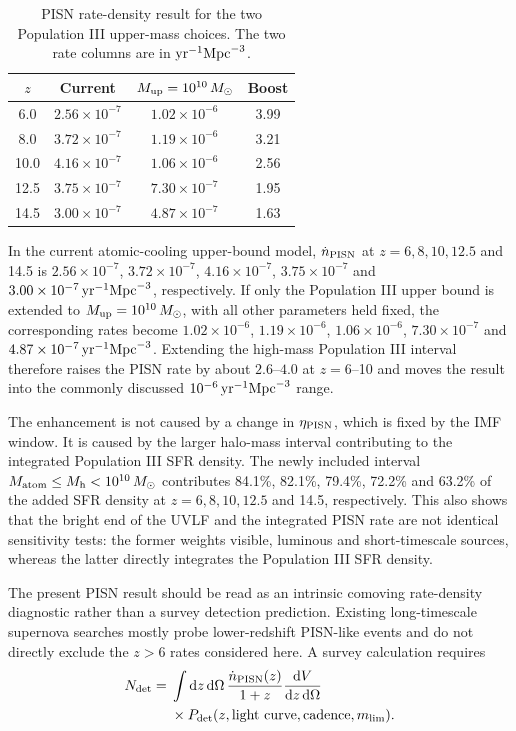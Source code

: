 \documentclass[twocolumn,times]{aastex701}
\newcommand{\Msun}{M_\odot}
\newcommand{\dd}{\mathrm{d}}
\begin{document}
\begin{table}[tbp]
\caption{PISN rate-density result for the two Population III upper-mass choices. The two rate columns are in ${\rm yr}^{-1}{\rm Mpc}^{-3}$.}
\label{tab:pisn-rates}
\centering
\scriptsize
\setlength{\tabcolsep}{2.8pt}
\begin{tabular}{cccc}
\toprule
$z$ & Current & $M_{\rm up}=10^{10}\,\Msun$ & Boost \\
\midrule
6.0  & $2.56\times10^{-7}$ & $1.02\times10^{-6}$ & 3.99 \\
8.0  & $3.72\times10^{-7}$ & $1.19\times10^{-6}$ & 3.21 \\
10.0 & $4.16\times10^{-7}$ & $1.06\times10^{-6}$ & 2.56 \\
12.5 & $3.75\times10^{-7}$ & $7.30\times10^{-7}$ & 1.95 \\
14.5 & $3.00\times10^{-7}$ & $4.87\times10^{-7}$ & 1.63 \\
\bottomrule
\end{tabular}
\end{table}

In the current atomic-cooling upper-bound model, $\dot n_{\rm PISN}$ at $z=6,8,10,12.5$ and 14.5 is $2.56\times10^{-7}$, $3.72\times10^{-7}$, $4.16\times10^{-7}$, $3.75\times10^{-7}$ and $3.00\times10^{-7}\,{\rm yr}^{-1}{\rm Mpc}^{-3}$, respectively. If only the Population III upper bound is extended to $M_{\rm up}=10^{10}\,M_\odot$, with all other parameters held fixed, the corresponding rates become $1.02\times10^{-6}$, $1.19\times10^{-6}$, $1.06\times10^{-6}$, $7.30\times10^{-7}$ and $4.87\times10^{-7}\,{\rm yr}^{-1}{\rm Mpc}^{-3}$. Extending the high-mass Population III interval therefore raises the PISN rate by about $2.6$--$4.0$ at $z=6$--10 and moves the result into the commonly discussed $10^{-6}\,{\rm yr}^{-1}{\rm Mpc}^{-3}$ range.

The enhancement is not caused by a change in $\eta_{\rm PISN}$, which is fixed by the IMF window. It is caused by the larger halo-mass interval contributing to the integrated Population III SFR density. The newly included interval $M_{\rm atom}\le M_{\rm h}<10^{10}\,M_\odot$ contributes 84.1\%, 82.1\%, 79.4\%, 72.2\% and 63.2\% of the added SFR density at $z=6,8,10,12.5$ and 14.5, respectively. This also shows that the bright end of the UVLF and the integrated PISN rate are not identical sensitivity tests: the former weights visible, luminous and short-timescale sources, whereas the latter directly integrates the Population III SFR density.

The present PISN result should be read as an intrinsic comoving rate-density diagnostic rather than a survey detection prediction. Existing long-timescale supernova searches mostly probe lower-redshift PISN-like events and do not directly exclude the $z>6$ rates considered here. A survey calculation requires
\begin{equation}
  \begin{split}
  N_{\rm det}={}&\int \dd z\,\dd\Omega\,
  \frac{\dot n_{\rm PISN}(z)}{1+z}
  \frac{\dd V}{\dd z\,\dd\Omega} \\
  &\times
  P_{\rm det}(z,{\rm light\ curve},{\rm cadence},m_{\rm lim}) .
  \end{split}
\end{equation}



\end{document}
